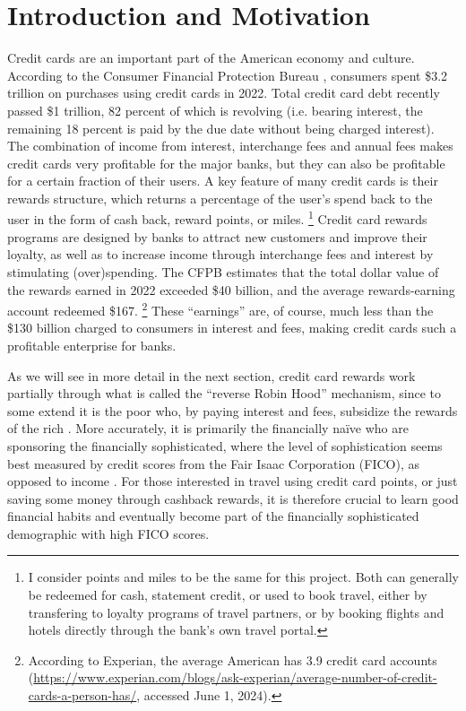 \section{Introduction and Motivation} \label{sec:Introduction}

Credit cards are an important part of the American economy and culture.
According to the Consumer Financial Protection Bureau \citep{cfpb:2023}, consumers spent \$3.2 trillion on purchases using credit cards in 2022. 
Total credit card debt recently passed \$1 trillion, 82 percent of which is revolving (i.e. bearing interest, the remaining 18 percent is paid by the due date without being charged interest). 
The combination of income from interest, interchange fees and annual fees makes credit cards very profitable for the major banks, but they can also be profitable for a certain fraction of their users.
A key feature of many credit cards is their rewards structure, which returns a percentage of the user's spend back to the user in the form of cash back, reward points, or miles.%
\footnote{I consider points and miles to be the same for this project. Both can generally be redeemed for cash, statement credit, or used to book travel, either by transfering to loyalty programs of travel partners, or by booking flights and hotels directly through the bank's own travel portal.}
Credit card rewards programs are designed by banks to attract new customers and improve their loyalty, as well as to increase income through interchange fees and interest by stimulating (over)spending.
The CFPB estimates that the total dollar value of the rewards earned in 2022 exceeded \$40 billion, and the average rewards-earning account redeemed \$167.%
\footnote{According to Experian, the average American has 3.9 credit card accounts (\url{https://www.experian.com/blogs/ask-experian/average-number-of-credit-cards-a-person-has/}, accessed June 1, 2024).} 
These ``earnings'' are, of course, much less than the \$130 billion charged to consumers in interest and fees, making credit cards such a profitable enterprise for banks. 

As we will see in more detail in the next section, credit card rewards work partially through what is called the ``reverse Robin Hood'' mechanism, since to some extend it is the poor who, by paying interest and fees, subsidize the rewards of the rich \citep{wsj:2010}.
More accurately, it is primarily the financially na\"{i}ve who are sponsoring the financially sophisticated, where the level of sophistication seems best measured by credit scores from the Fair Isaac Corporation (FICO), as opposed to income \citep*{agaretal:2023}.
For those interested in travel using credit card points, or just saving some money through cashback rewards, it is therefore crucial to learn good financial habits and eventually become part of the financially sophisticated demographic with high FICO scores. 

